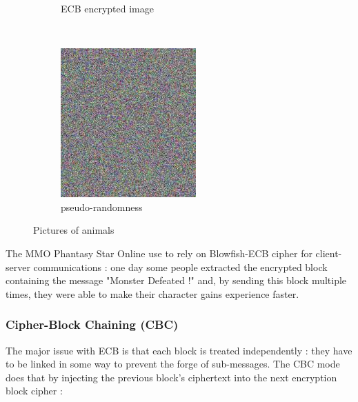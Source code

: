 \begin{figure}[b]
\begin{subfigure}[c]{0.27\textwidth}
                \caption{ECB encrypted image}
                \label{fig:ECB_Exemple_encrypted}
        \end{subfigure}
		~		        
        \begin{subfigure}[c]{0.27\textwidth}
                \centering
                \includegraphics[width=\textwidth]{images/Tux_secure.jpg}
                \caption{  pseudo-randomness }
                \label{fig:ECB_Exemple_objectif}
        \end{subfigure}
        \caption{Pictures of animals}\label{fig:ECB_flaw}
\end{figure}

The MMO Phantasy Star Online use to rely on Blowfish-ECB cipher for client-server communications : one day some people extracted the encrypted block containing the message "Monster Defeated !" and, by sending this block multiple times, they were able to make their character gains experience faster.

\subsubsection{ Cipher-Block Chaining (CBC) }

The major issue with ECB is that each block is treated independently : they have to be linked in some way to prevent the forge of sub-messages. The CBC mode does that by injecting the previous block's ciphertext into the next encryption block cipher : 


